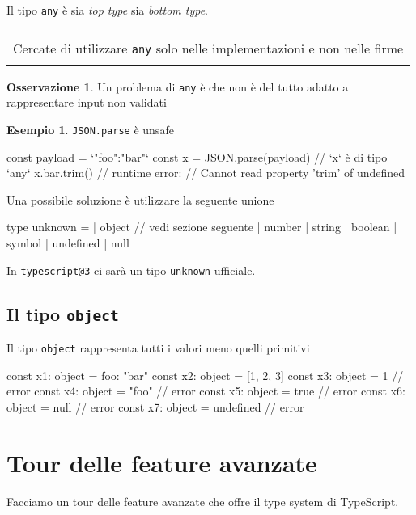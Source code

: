 \documentclass[12pt]{article}
\theoremstyle{definition}
\newtheorem{example}{Esempio}[subsection]
\newtheorem{observation}{Osservazione}[subsection]
\newenvironment{boxed}
    {\begin{center}
    \begin{tabular}{|p{0.9\textwidth}|}
    \hline\\
    }
    {
    \\\\\hline
    \end{tabular}
    \end{center}
    }
\newenvironment{code}
  {\vspace{0.5cm} \VerbatimEnvironment\begin{typescriptcode}}
  {\end{typescriptcode} \vspace{0.2cm}}
\begin{document}
Il tipo \texttt{any} è sia \emph{top type} sia \emph{bottom type}.

\begin{boxed}
Cercate di utilizzare \texttt{any} solo nelle implementazioni e non nelle firme
\end{boxed}

\begin{observation}
Un problema di \texttt{any} è che non è del tutto adatto a rappresentare input non validati
\end{observation}

\begin{example}
\texttt{JSON.parse} è unsafe

\begin{code}
const payload = `{"foo":"bar"}`
const x = JSON.parse(payload)
// `x` è di tipo `any`
x.bar.trim() // runtime error:
// Cannot read property 'trim' of undefined
\end{code}
\end{example}

Una possibile soluzione è utilizzare la seguente unione

\begin{code}
type unknown =
  | object // vedi sezione seguente
  | number
  | string
  | boolean
  | symbol
  | undefined
  | null
\end{code}

In \texttt{typescript@3} ci sarà un tipo \texttt{unknown} ufficiale.

\subsection{Il tipo \texttt{object}}

Il tipo \texttt{object} rappresenta tutti i valori meno quelli primitivi

\begin{code}
const x1: object = { foo: "bar" }
const x2: object = [1, 2, 3]
const x3: object = 1 // error
const x4: object = "foo" // error
const x5: object = true // error
const x6: object = null // error
const x7: object = undefined // error
\end{code}

\newpage

\section{Tour delle feature avanzate}

Facciamo un tour delle feature avanzate che offre il type system di TypeScript.
\end{document}
